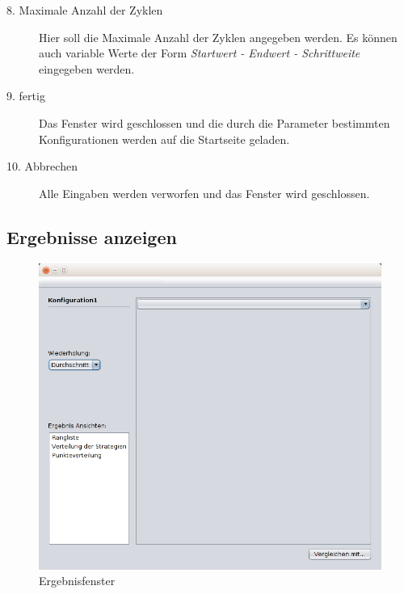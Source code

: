 \begin{description}
\item[8. Maximale Anzahl der Zyklen] Hier soll die Maximale Anzahl der Zyklen angegeben werden. Es können auch variable Werte der Form \textit{Startwert - Endwert - Schrittweite} eingegeben werden.

\item[9. fertig] Das Fenster wird geschlossen und die durch die Parameter bestimmten Konfigurationen werden auf die Startseite geladen.

\item[10. Abbrechen] Alle Eingaben werden verworfen und das Fenster wird geschlossen.


\end{description}

\pagebreak


\subsection{Ergebnisse anzeigen}

\begin{figure}[!hp] 
  \centering
     \includegraphics[width=1.1\textwidth]{GUI_Entwurf/Ergebnisfenster(1).png}
  \caption{Ergebnisfenster}
  \label{fig:Bild7}
\end{figure}

